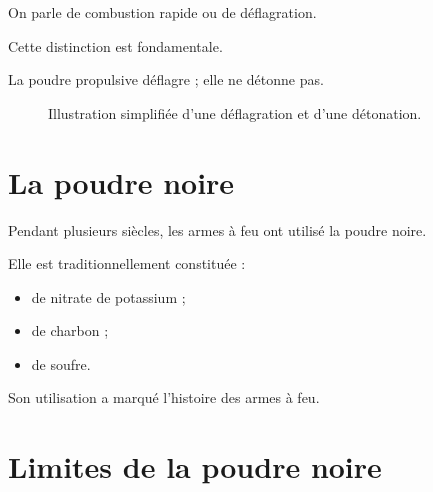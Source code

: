 On parle de combustion rapide ou de déflagration.

Cette distinction est fondamentale.

\begin{aretenir}

La poudre propulsive déflagre ; elle ne détonne pas.

\end{aretenir}

\begin{figure}[htbp]
\centering


\caption{Illustration simplifiée d'une déflagration et d'une détonation.}
\label{fig:deflagration_detonation}
\end{figure}

\section{La poudre noire}

Pendant plusieurs siècles, les armes à feu ont utilisé la poudre noire.

Elle est traditionnellement constituée :

\begin{itemize}
    \item de nitrate de potassium ;
    \item de charbon ;
    \item de soufre.
\end{itemize}

Son utilisation a marqué l'histoire des armes à feu.

\section{Limites de la poudre noire}


